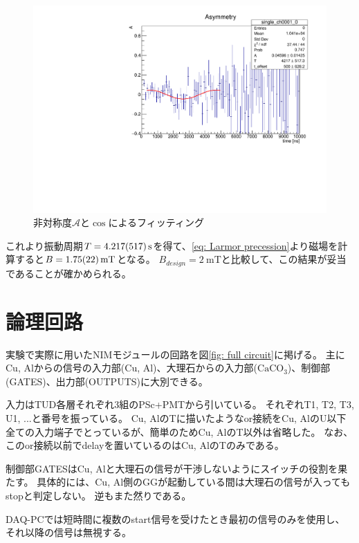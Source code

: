 \documentclass[dvipdfmx]{jsarticle}
\begin{document}
\begin{figure}
    \centering
    \includegraphics[width=12cm]{../analysis/Larmor/ver2/asymmetry.pdf}
    \caption{非対称度$\mathscr{A}$と$\cos$によるフィッティング}
    \label{fig: result: asymmetry}
\end{figure}

これより振動周期$T=\SI{4.217\pm0.517}{\second}$を得て、\eqref{eq: Larmor precession}より磁場を計算すると$B=\SI{1.75+-0.22}{\milli\tesla}$となる。
$B_{design}=\SI{2}{\milli\tesla}$と比較して、この結果が妥当であることが確かめられる。


\appendix


\section{論理回路}
\label{sec: logic circuit}

実験で実際に用いたNIMモジュールの回路を図\ref{fig: full circuit}に掲げる。
主にCu, Alからの信号の入力部(Cu, Al)、大理石からの入力部($\mathrm{CaCO_3}$)、制御部(GATES)、出力部(OUTPUTS)に大別できる。

入力はTUD各層それぞれ3組のPSc+PMTから引いている。
それぞれT1, T2, T3, U1, ...と番号を振っている。
Cu, AlのTに描いたようなor接続をCu, AlのU以下全ての入力端子でとっているが、簡単のためCu, AlのT以外は省略した。
なお、このor接続以前でdelayを置いているのはCu, AlのTのみである。

制御部GATESはCu, Alと大理石の信号が干渉しないようにスイッチの役割を果たす。
具体的には、Cu, Al側のGGが起動している間は大理石の信号が入ってもstopと判定しない。
逆もまた然りである。

DAQ-PCでは短時間に複数のstart信号を受けたとき最初の信号のみを使用し、それ以降の信号は無視する。
\end{document}
